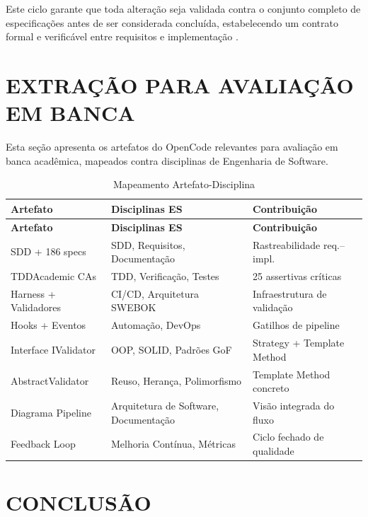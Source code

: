 \documentclass[
  brazil,
  sumario=tradicional,
  10pt
]{abntex2}
\begin{document}
Este ciclo garante que toda alteração seja validada contra o conjunto
completo de especificações antes de ser considerada concluída,
estabelecendo um contrato formal e verificável entre requisitos e
implementação \cite{humble2010continuous}.

\section{EXTRAÇÃO PARA AVALIAÇÃO EM BANCA}

Esta seção apresenta os artefatos do OpenCode relevantes para avaliação
em banca acadêmica, mapeados contra disciplinas de Engenharia de Software.

\begin{longtable}{p{4cm}p{4cm}p{4cm}}
  \caption{Mapeamento Artefato-Disciplina}
  \label{tab:banca}\\
  \toprule
  \textbf{Artefato} & \textbf{Disciplinas ES} & \textbf{Contribuição} \\
  \midrule
  \endfirsthead
  \toprule
  \textbf{Artefato} & \textbf{Disciplinas ES} & \textbf{Contribuição} \\
  \midrule
  \endhead
  \bottomrule
  \endfoot
  SDD + 186 specs & SDD, Requisitos, Documentação & Rastreabilidade req.--impl. \\
  TDDAcademic CAs & TDD, Verificação, Testes & 25 assertivas críticas \\
  Harness + Validadores & CI/CD, Arquitetura SWEBOK & Infraestrutura de validação \\
  Hooks + Eventos & Automação, DevOps & Gatilhos de pipeline \\
  Interface IValidator & OOP, SOLID, Padrões GoF & Strategy + Template Method \\
  AbstractValidator & Reuso, Herança, Polimorfismo & Template Method concreto \\
  Diagrama Pipeline & Arquitetura de Software, Documentação & Visão integrada do fluxo \\
  Feedback Loop & Melhoria Contínua, Métricas & Ciclo fechado de qualidade \\
\end{longtable}

\section{CONCLUSÃO}
\end{document}

